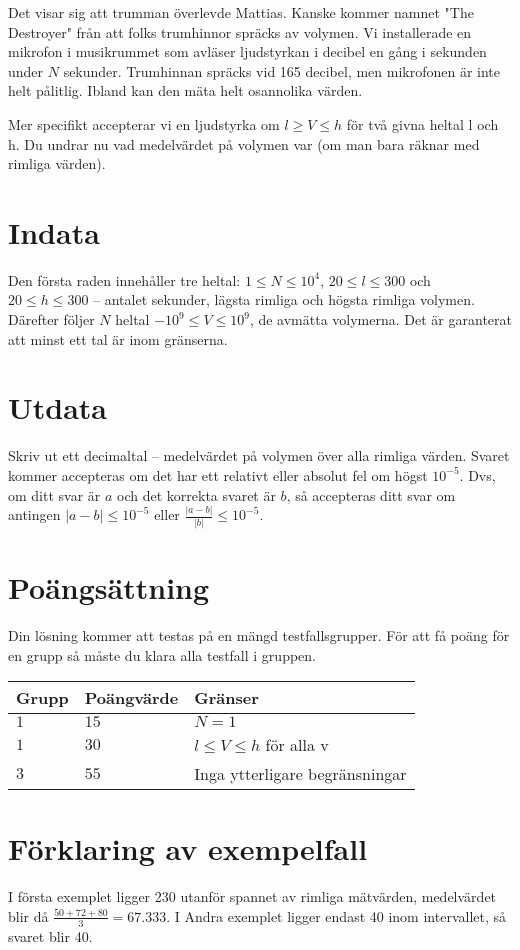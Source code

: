 Det visar sig att trumman överlevde Mattias. Kanske kommer namnet "The Destroyer" från att folks trumhinnor spräcks av volymen.
Vi installerade en mikrofon i musikrummet som avläser ljudstyrkan i decibel en gång i sekunden under $N$ sekunder. 
Trumhinnan spräcks vid 165 decibel, men mikrofonen är inte helt pålitlig. Ibland kan den mäta helt osannolika värden.

Mer specifikt accepterar vi en ljudstyrka om $l \ge V \leq h$ för två givna heltal l och h. Du undrar nu vad medelvärdet på volymen var (om man bara räknar med rimliga värden).


\section*{Indata}
Den första raden innehåller tre heltal: $1\leq N \leq 10^4$, $20 \leq l \leq 300$ och $20 \leq h \leq 300$  -- antalet sekunder, lägsta rimliga och högsta rimliga volymen. 
Därefter följer $N$ heltal $-10^9 \leq V \leq 10^9$, de avmätta volymerna.
Det är garanterat att minst ett tal är inom gränserna.

\section*{Utdata}
Skriv ut ett decimaltal -- medelvärdet på volymen över alla rimliga värden.
Svaret kommer accepteras om det har ett relativt eller absolut fel om högst $10^{-5}$.
Dvs, om ditt svar är $a$ och det korrekta svaret är $b$, så accepteras ditt svar om
antingen $|a-b| \le 10^{-5}$ eller $\frac{|a-b|}{|b|} \le 10^{-5}$.

\section*{Poängsättning}
Din lösning kommer att testas på en mängd testfallsgrupper.
För att få poäng för en grupp så måste du klara alla testfall i gruppen.

\noindent
\begin{tabular}{| l | l | p{12cm} |}
  \hline
  Grupp & Poängvärde & Gränser \\ \hline
  $1$   & $15$       & $N=1$ \\ \hline
  $1$   & $30$       & $l \leq V \leq h$ för alla v \\ \hline
  $3$   & $55$       & Inga ytterligare begränsningar \\ \hline
\end{tabular}

\section*{Förklaring av exempelfall}
I första exemplet ligger 230 utanför spannet av rimliga mätvärden, medelvärdet blir då $\frac{50+72+80}{3} = 67.333$.
I Andra exemplet ligger endast 40 inom intervallet, så svaret blir 40.
